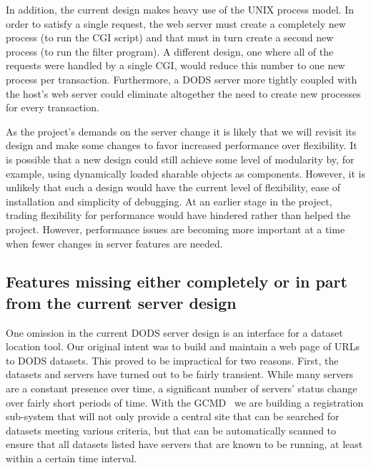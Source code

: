 \documentclass{article}
\begin{document}
In addition, the current design makes heavy use of the UNIX process model. In
order to satisfy a single request, the web server must create a completely
new process (to run the \ac{CGI} script) and that must in turn create a
second new process (to run the filter program). A different design, one where
all of the requests were handled by a single \ac{CGI}, would reduce this
number to one new process per transaction. Furthermore, a \ac{DODS} server
more tightly coupled with the host's web server could eliminate altogether
the need to create new processes for every transaction.

As the project's demands on the server change it is likely that we will
revisit its design and make some changes to favor increased performance over
flexibility. It is possible that a new design could still achieve some level
of modularity by, for example, using dynamically loaded sharable objects as
components. However, it is unlikely that such a design would have the current
level of flexibility, ease of installation and simplicity of debugging. At an
earlier stage in the project, trading flexibility for performance would have
hindered rather than helped the project. However, performance issues are
becoming more important at a time when fewer changes in server features are
needed.

\subsection{Features missing either completely or in part from the 
current server design}

One omission in the current \ac{DODS} server design is an interface for a
dataset location tool. Our original intent was to build and maintain a web
page of \acs{URL}s to \ac{DODS} datasets. This proved to be impractical for
two reasons.  First, the datasets and servers have turned out to be fairly
transient.  While many servers are a constant presence over time, a
significant number of servers' status change over fairly short periods of
time. With the \ac{GCMD}~\cite{gcmd} we are building a registration
sub-system that will not only provide a central site that can be searched for
datasets meeting various criteria, but that can be automatically scanned to
ensure that all datasets listed have servers that are known to be running, at
least within a certain time interval.
\end{document}
